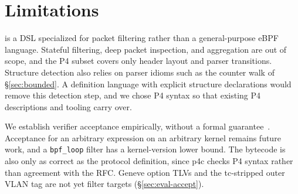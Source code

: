 \section{Limitations}
\label{sec:limitations}

\kunai is a DSL specialized for packet filtering rather than a
general-purpose eBPF language. Stateful filtering, deep packet
inspection, and aggregation are out of scope, and the P4 subset
covers only header layout and parser transitions. Structure detection
also relies on parser idioms such as the counter walk of
\S\ref{sec:bounded}. A definition language with explicit structure
declarations would remove this detection step, and we chose P4 syntax
so that existing P4 descriptions and tooling carry over.

We establish verifier acceptance empirically, without a formal
guarantee~\cite{vishwanathan2022tristate}. Acceptance for an arbitrary
expression on an arbitrary kernel remains future work, and a
\texttt{bpf\_loop} filter has a kernel-version lower bound. The
bytecode is also only as correct as the protocol definition, since p4c
checks P4 syntax rather than agreement with the RFC. Geneve option
TLVs and the tc-stripped outer VLAN tag are not yet filter targets
(\S\ref{sec:eval-accept}).